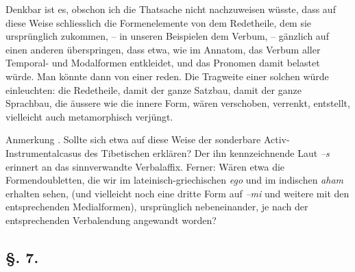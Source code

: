 {Denkbar ist es, obschon ich die Thatsache nicht nachzuweisen wüsste, dass auf diese Weise schliesslich die Formenelemente von dem Redetheile, dem sie ursprünglich zukommen, – in unseren Beispielen dem Verbum, – gänzlich auf einen anderen überspringen, dass etwa, wie im Annatom, das Verbum aller Temporal- und Modalformen entkleidet, und das Pronomen damit belastet würde. Man könnte dann von einer  reden. Die Tragweite einer solchen würde einleuchten: die Redetheile, damit der ganze Satzbau, damit der ganze Sprachbau, die äussere wie die innere Form, wären verschoben, verrenkt, entstellt, vielleicht auch metamorphisch verjüngt.

\begin{styleAnmerk}
Anmerkung . Sollte sich etwa auf diese Weise der sonderbare Activ-Instrumentalcasus des Tibetischen erklären? Der ihn kennzeichnende Laut \textit{–s} erinnert an das sinnverwandte Verbalaffix. Ferner: Wären etwa die Formendoubletten, die wir im lateinisch-griechischen \textit{ego} und im indischen \textit{aham} erhalten sehen, (und vielleicht noch eine dritte Form auf \textit{–mi} und weitere mit den entsprechenden Medialformen), ursprünglich nebeneinander, je nach der entsprechenden Verbalendung angewandt worden?
\end{styleAnmerk}

\begin{styleAnmerk}
\end{styleAnmerk}

\begin{styleAnmerk}
\end{styleAnmerk}

\label{sp.215}

\clearpage{}
\subsection*{§. 7.}\label{III.II.II.7}
}
